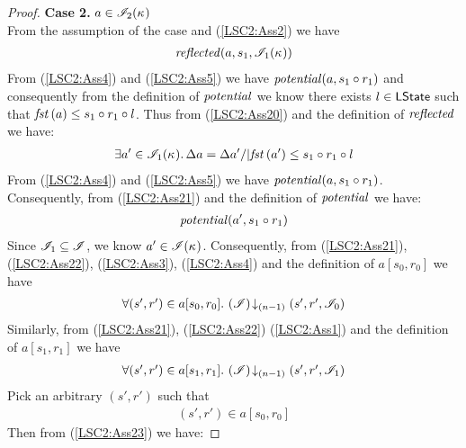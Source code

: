 \begin{lemma}
\begin{proof}
\noindent\textbf{Case 2. } $a \in \mathscr{I}_2(\kappa_{})$\\
From the assumption of the case and (\ref{LSC2:Ass2}) we have
%
\begin{align}
	\mathit{reflected}(a, s_1, \mathscr{I}_1(\kappa_{}))
	\label{LSC2:Ass20}
\end{align}
From (\ref{LSC2:Ass4}) and (\ref{LSC2:Ass5}) we have $\mathit{potential}(a, s_1 \circ r_1)$ and consequently from the definition of $\mathit{potential}$ we know there exists $l \in \textsf{LState}$ such that $\mathit{fst}\left(a\right) \leq s_1 \circ r_1 \circ l$. Thus from (\ref{LSC2:Ass20}) and the definition of $\mathit{reflected}$ we have:
%
\begin{align}
	\exists a' \in \mathscr{I}_1(\kappa_{}) .\, \Delta {a} = \Delta {a'} /| \mathit{fst}\left(a'\right) \leq s_1 \circ r_1 \circ l
	\label{LSC2:Ass21}
\end{align}
%
From (\ref{LSC2:Ass4}) and (\ref{LSC2:Ass5}) we have $\mathit{potential}(a, s_1 \circ r_1)$. Consequently, from (\ref{LSC2:Ass21}) and the definition of $\mathit{potential}$ we have:
%
\begin{align}
	\mathit{potential}(a', s_1 \circ r_1)
	\label{LSC2:Ass22}
\end{align}
%
Since $\mathscr{I}_1 \subseteq \mathscr{I}$, we know $a' \in \mathscr{I}(\kappa_{})$. Consequently, from (\ref{LSC2:Ass21}), (\ref{LSC2:Ass22}), (\ref{LSC2:Ass3}), (\ref{LSC2:Ass4}) and the definition of $a[s_0, r_0]$ we have
%
\begin{align}
	\begin{array}{@{} l @{}}
		\for{(s', r') \in a[s_0, r_0]} \extendsAMUpto{\lmod}{(n-1)}{s'}{r'}{\lmod_0}
	\end{array}
	\label{LSC2:Ass23}
\end{align}
%
Similarly, from (\ref{LSC2:Ass21}), (\ref{LSC2:Ass22}) (\ref{LSC2:Ass1}) and the definition of $a[s_1, r_1]$ we have
%
\begin{align}
	\begin{array}{@{} l @{}}
		\for{(s', r') \in a[s_1, r_1]} \extendsAMUpto{\lmod}{(n-1)}{s'}{r'}{\lmod_1}
	\end{array}
	\label{LSC2:Ass24}
\end{align}
%
Pick an arbitrary $(s', r')$ such that
%
\begin{align}
	(s', r') \in a[s_0, r_0]
	\label{LSC2:Ass25}
\end{align}
Then from (\ref{LSC2:Ass23}) we have: 

\end{proof}
\end{lemma}
